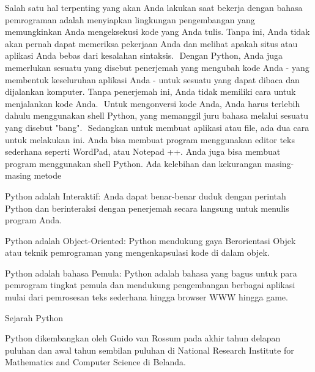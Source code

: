 {\fontsize{14pt}{14pt}\selectfont \vspace{\baselineskip}
Salah satu hal terpenting yang akan Anda lakukan saat bekerja dengan bahasa pemrograman adalah menyiapkan lingkungan pengembangan yang memungkinkan Anda mengeksekusi kode yang Anda tulis. Tanpa ini, Anda tidak akan pernah dapat memeriksa pekerjaan Anda dan melihat apakah situs atau aplikasi Anda bebas dari kesalahan sintaksis.  $  $ Dengan Python, Anda juga memerlukan sesuatu yang disebut penerjemah yang mengubah kode Anda - yang membentuk keseluruhan aplikasi Anda - untuk sesuatu yang dapat dibaca dan dijalankan komputer. Tanpa penerjemah ini, Anda tidak memiliki cara untuk menjalankan kode Anda.  $  $ Untuk mengonversi kode Anda, Anda harus terlebih dahulu menggunakan shell Python, yang memanggil juru bahasa melalui sesuatu yang disebut "bang".  $  $ Sedangkan untuk membuat aplikasi atau file, ada dua cara untuk melakukan ini. Anda bisa membuat program menggunakan editor teks sederhana seperti WordPad, atau Notepad ++. Anda juga bisa membuat program menggunakan shell Python. Ada kelebihan dan kekurangan masing-masing metode \\} \par
\vspace{14pt}
\noindent 
{\fontsize{14pt}{14pt}\selectfont Python adalah Interaktif: Anda dapat benar-benar duduk dengan perintah Python dan berinteraksi dengan penerjemah secara langsung untuk menulis program Anda. \\} \par
\vspace{14pt}
\noindent 
{\fontsize{14pt}{14pt}\selectfont Python adalah Object-Oriented: Python mendukung gaya Berorientasi Objek atau teknik pemrograman yang mengenkapsulasi kode di dalam objek. \\} \par
\vspace{14pt}
\noindent 
{\fontsize{14pt}{14pt}\selectfont Python adalah bahasa Pemula: Python adalah bahasa yang bagus untuk para pemrogram tingkat pemula dan mendukung pengembangan berbagai aplikasi mulai dari pemrosesan teks sederhana hingga browser WWW hingga game. \\} \par
\vspace{14pt}
\noindent 
{\fontsize{14pt}{14pt}\selectfont Sejarah Python \\} \par
\noindent 
{\fontsize{14pt}{14pt}\selectfont Python dikembangkan oleh Guido van Rossum pada akhir tahun delapan puluhan dan awal tahun sembilan puluhan di National Research Institute for Mathematics and Computer Science di Belanda. \\} \par
